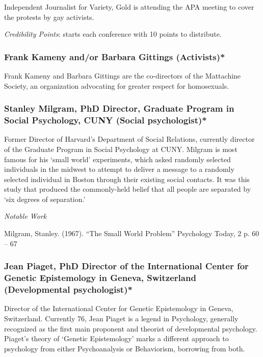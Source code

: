 \begin{refsection}
Independent Journalist for Variety, Gold is attending the APA meeting to cover the protests by gay activists.

\emph{Credibility Points}: starts each conference with 10 points to distribute.

\subsubsection{Frank Kameny and\slash or Barbara Gittings (Activists)*}
\label{frankkamenyandorbarbaragittingsactivists}

Frank Kameny and Barbara Gittings are the co-directors of the Mattachine Society, an organization advocating for greater respect for homosexuals.

\subsubsection{Stanley Milgram, PhD Director, Graduate Program in Social Psychology, CUNY (Social psychologist)*}
\label{stanleymilgramphddirectorgraduateprograminsocialpsychologycunysocialpsychologist}

Former Director of Harvard's Department of Social Relations, currently director of the Graduate Program in Social Psychology at CUNY. Milgram is most famous for his `small world' experiments, which asked randomly selected individuals in the midwest to attempt to deliver a message to a randomly selected individual in Boston through their existing social contacts. It was this study that produced the commonly-held belief that all people are separated by `six degrees of separation.'

\emph{Notable Work}

Milgram, Stanley. (1967). ``The Small World Problem'' Psychology Today, 2 p. 60 – 67

\subsubsection{Jean Piaget, PhD Director of the International Center for Genetic Epistemology in Geneva, Switzerland (Developmental psychologist)*}
\label{jeanpiagetphddirectoroftheinternationalcenterforgeneticepistemologyingenevaswitzerlanddevelopmentalpsychologist}

Director of the International Center for Genetic Epistemology in Geneva, Switzerland. Currently 76, Jean Piaget is a legend in Psychology, generally recognized as the first main proponent and theorist of developmental psychology. Piaget's theory of `Genetic Epistemology' marks a different approach to psychology from either Psychoanalysis or Behaviorism, borrowing from both.


\end{refsection}

